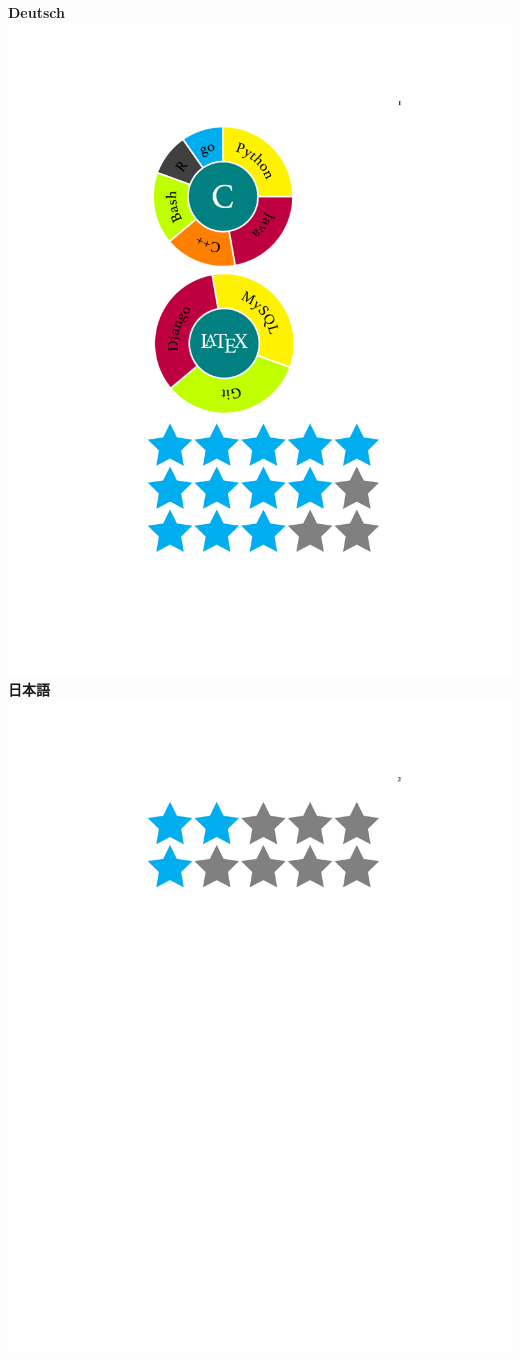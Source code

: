 \documentclass[]{friggeri-cv}
\begin{document}
\begin{aside}
    \textbf{Deutsch}\includegraphics[scale=0.16]{img/3stars}
    \textbf{日本語}\includegraphics[scale=0.16]{img/2stars}
\end{aside}
\end{document}
